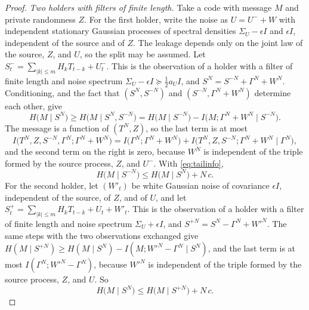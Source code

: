\documentclass[11pt,onecolumn]{IEEEtran}
\begin{document}
\begin{proof}
\emph{Two holders with filters of finite length.} Take a code with
message $M$ and private randomness $Z$. For the first holder, write the
noise as $U=U^-+W$ with independent stationary Gaussian processes of
spectral densities $\Sigma_U-\epsilon I$ and $\epsilon I$, independent
of the source and of $Z$. The leakage depends only on the joint law of
the source, $Z$, and $U$, so the split may be assumed. Let
$S^-_t=\sum_{|k|\le m}H_kT_{t-k}+U^-_t$. This is the observation of a
holder with a filter of finite length and noise spectrum
$\Sigma_U-\epsilon I\succeq\tfrac12a_UI$, and
$S^N=S^{-N}+\Gamma^N+W^N$. Conditioning, and the fact that
$(S^N,S^{-N})$ and $(S^{-N},\Gamma^N+W^N)$ determine each other, give
\[
H\bigl(M\mid S^N\bigr)\ge H\bigl(M\mid S^N,S^{-N}\bigr)
=H\bigl(M\mid S^{-N}\bigr)-I\bigl(M;\Gamma^N+W^N\mid S^{-N}\bigr).
\]
The message is a function of $(T^N,Z)$, so the last term is at most
\[
I\bigl(T^N,Z,S^{-N},\Gamma^N;\Gamma^N+W^N\bigr)
=I\bigl(\Gamma^N;\Gamma^N+W^N\bigr)+I\bigl(T^N,Z,S^{-N};\Gamma^N+W^N\mid\Gamma^N\bigr),
\]
and the second term on the right is zero, because $W^N$ is independent
of the triple formed by the source process, $Z$, and $U^-$. With \eqref{eq:tailinfo},
\begin{equation}
H\bigl(M\mid S^{-N}\bigr)\le H\bigl(M\mid S^N\bigr)+N\,c .
\label{eq:iirdown}
\end{equation}
For the second holder, let $(W'_t)$ be white Gaussian noise of
covariance $\epsilon I$, independent of the source, of $Z$, and of $U$,
and let $S^+_t=\sum_{|k|\le m}H_kT_{t-k}+U_t+W'_t$. This is the
observation of a holder with a filter of finite length and noise
spectrum $\Sigma_U+\epsilon I$, and $S^{+N}=S^N-\Gamma^N+W'^N$. The same
steps with the two observations exchanged give
$H(M\mid S^{+N})\ge H(M\mid S^N)-I(M;W'^N-\Gamma^N\mid S^N)$, and the
last term is at most $I(\Gamma^N;W'^N-\Gamma^N)$, because $W'^N$ is
independent of the triple formed by the source process, $Z$, and $U$. So
\begin{equation}
H\bigl(M\mid S^N\bigr)\le H\bigl(M\mid S^{+N}\bigr)+N\,c .
\label{eq:iirup}
\end{equation}


\end{proof}
\end{document}
